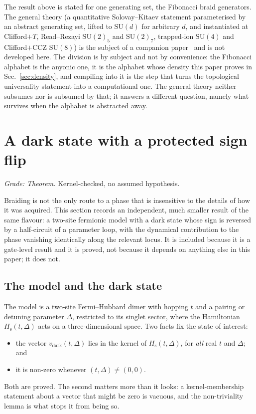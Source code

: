 \documentclass[aps,prx,nofootinbib,superscriptaddress,12pt]{revtex4-2}
\begin{document}
The result above is stated for one generating set, the Fibonacci braid
generators. The general theory (a quantitative Solovay--Kitaev
statement parameterised by an abstract generating set, lifted to
$\mathrm{SU}(d)$ for arbitrary $d$, and instantiated at Clifford$+T$,
Read--Rezayi $\mathrm{SU}(2)_5$ and $\mathrm{SU}(2)_7$, trapped-ion
$\mathrm{SU}(4)$ and Clifford$+\mathrm{CCZ}$ $\mathrm{SU}(8)$) is the
subject of a companion paper~\cite{RoehmD8Compilation} and is not
developed here. The division is by subject and not by convenience: the
Fibonacci alphabet is the anyonic one, it is the alphabet whose density
this paper proves in Sec.~\ref{sec:density}, and compiling into it is the
step that turns the topological universality statement into a
computational one. The general theory neither subsumes nor is subsumed
by that; it answers a different question, namely what survives when the
alphabet is abstracted away.

\section{A dark state with a protected sign flip}
\label{sec:gate}

\emph{Grade: Theorem.} Kernel-checked, no assumed hypothesis.

Braiding is not the only route to a phase that is insensitive to the
details of how it was acquired. This section records an independent,
much smaller result of the same flavour: a two-site fermionic model with
a dark state whose sign is reversed by a half-circuit of a parameter
loop, with the dynamical contribution to the phase vanishing identically
along the relevant locus. It is included because it is a gate-level
result and it is proved, not because it depends on anything else in this
paper; it does not.

\subsection{The model and the dark state}

The model is a two-site Fermi--Hubbard dimer with hopping $t$ and a
pairing or detuning parameter $\Delta$, restricted to its singlet
sector, where the Hamiltonian $H_{\mathrm{s}}(t,\Delta)$ acts on a
three-dimensional space. Two facts fix the state of interest:
\begin{itemize}
\item the vector $v_{\mathrm{dark}}(t,\Delta)$ lies in the kernel of
  $H_{\mathrm{s}}(t,\Delta)$, for \emph{all} real $t$ and $\Delta$; and
\item it is non-zero whenever $(t,\Delta) \neq (0,0)$.
\end{itemize}
Both are proved. The second matters more than it looks: a kernel-membership
statement about a vector that might be zero is vacuous, and the
non-triviality lemma is what stops it from being so.
\end{document}
